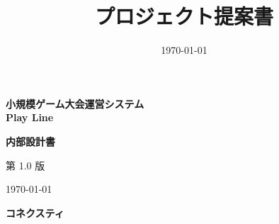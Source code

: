 \documentclass[a4paper]{ltjsarticle}
\title{プロジェクト提案書}
\author{}
\date{\today}
\begin{document}
\begin{titlepage}
    \centering
    \thispagestyle{empty} %

    \vspace*{3cm}

    {\Huge \bfseries 小規模ゲーム大会運営システム \\[0.3em] Play Line \par}

    \vspace{1.5cm}

    {\LARGE \bfseries 内部設計書 \par}

    \vspace{3.5cm}

    {\Large 第 1.0 版 \par}

    \vfill %

    {\large \today \par}

    \vspace{1.2cm}

    {\Large \bfseries コネクスティ \par}

    \vspace{1cm}
\end{titlepage}

\clearpage
{}

\tableofcontents
\clearpage

% 
% 
% 
% 
% 
% 
% 
% 
% 
% 
% 
\end{document}
